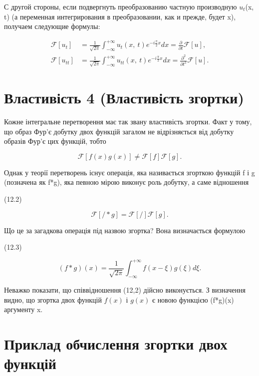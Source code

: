 \documentclass[
  ukrainian,
]{article}
\begin{document}
С другой стороны, если подвергнуть преобразованию частную производную
\(u_t\)(x, t) (а переменная интегрирования в преобразовании, как и
прежде, будет x), получаем следующие формулы:

\[
\begin{aligned} \mathcal{F}\left[u_{t}\right] &= \frac{1}{\sqrt{2\pi}} \int_{-\infty}^{+\infty} u_{t}\left(x, \ t\right) e^{-i\frac{\pi}{2}x} dx = \frac{\partial}{\partial t} \mathcal{F}\left[u\right], \\ \mathcal{F}\left[u_{tt}\right] &= \frac{1}{\sqrt{2\pi}} \int_{-\infty}^{+\infty} u_{tt}\left(x, \ t\right) e^{-i\frac{\pi}{2}x} dx = \frac{\partial^{2}}{\partial t^{2}} \mathcal{F}\left[u\right]. \end{aligned}
\]

\section{Властивість 4 (Властивість
згортки)}\label{ux432ux43bux430ux441ux442ux438ux432ux456ux441ux442ux44c-4-ux432ux43bux430ux441ux442ux438ux432ux456ux441ux442ux44c-ux437ux433ux43eux440ux442ux43aux438}

Кожне інтегральне перетворення має так звану властивість згортки. Факт у
тому, що образ Фур'є добутку двох функцій загалом не відрізняється від
добутку образів Фур'є цих функцій, тобто

\[
\mathcal{F}[f(x)g(x)] \neq \mathcal{F}[f]\mathcal{F}[g].
\]

Однак у теорії перетворень існує операція, яка називається згорткою
функцій f і g (позначена як f*g), яка певною мірою виконує роль добутку,
а саме відношення

(12.2)

\[
\mathcal{F}[/*g] = \mathcal{F}[/]\mathcal{F}[g].
\]

Що це за загадкова операція під назвою згортка? Вона визначається
формулою

(12.3)

\[
(f*g)(x) = \frac{1}{\sqrt{2\pi}} \int_{-\infty}^{+\infty} f(x-\xi) g(\xi) d\xi.
\]

Неважко показати, що співвідношення (12,2) дійсно виконується. З
визначення видно, що згортка двох функцій \(f(x)\) і \(g(x)\) є новою
функцією (f*g)(x) аргументу x.

\section{Приклад обчислення згортки двох
функцій}\label{ux43fux440ux438ux43aux43bux430ux434-ux43eux431ux447ux438ux441ux43bux435ux43dux43dux44f-ux437ux433ux43eux440ux442ux43aux438-ux434ux432ux43eux445-ux444ux443ux43dux43aux446ux456ux439}
\end{document}
